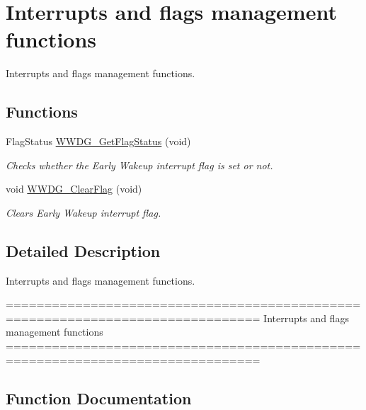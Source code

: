 \hypertarget{group___w_w_d_g___group3}{}\section{Interrupts and flags management functions}
\label{group___w_w_d_g___group3}


Interrupts and flags management functions.  


\subsection*{Functions}
\begin{DoxyCompactItemize}
\item 
Flag\+Status \hyperlink{group___w_w_d_g___group3_ga7df4882d45918b9b8249dfca1e44fabc}{W\+W\+D\+G\+\_\+\+Get\+Flag\+Status} (void)
\begin{DoxyCompactList}\small\item\em Checks whether the Early Wakeup interrupt flag is set or not. \end{DoxyCompactList}\item 
void \hyperlink{group___w_w_d_g___group3_gabd2b5a6317c2e1a3ab0795838ce59dd2}{W\+W\+D\+G\+\_\+\+Clear\+Flag} (void)
\begin{DoxyCompactList}\small\item\em Clears Early Wakeup interrupt flag. \end{DoxyCompactList}\end{DoxyCompactItemize}


\subsection{Detailed Description}
Interrupts and flags management functions. 

\begin{DoxyVerb} ===============================================================================
                 Interrupts and flags management functions
 ===============================================================================  \end{DoxyVerb}
 

\subsection{Function Documentation}
\hypertarget{group___w_w_d_g___group3_gabd2b5a6317c2e1a3ab0795838ce59dd2}{}
